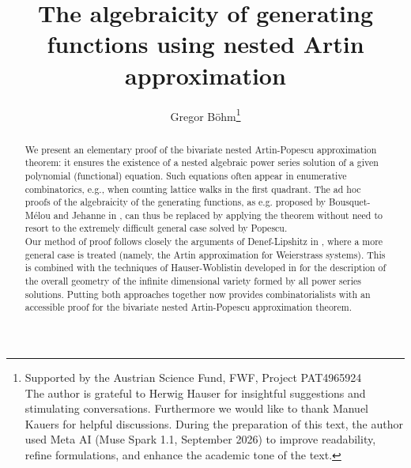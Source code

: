 \documentclass[10pt, a4paper]{article}
\date{}
\title{The algebraicity of generating functions using nested Artin approximation}
\theoremstyle{remark}
\theoremstyle{remark}
\begin{document}
\author{Gregor Böhm\footnote{Supported by the Austrian Science Fund, FWF, Project PAT4965924\\The author is grateful to Herwig Hauser for insightful suggestions and stimulating conversations. Furthermore we would like to thank Manuel Kauers for helpful discussions. During the preparation of this text, the author used Meta AI (Muse Spark 1.1, September 2026) to improve readability, refine formulations, and enhance the academic tone of the text.}}
\maketitle
\begin{abstract}
   We present an elementary proof of the bivariate nested Artin-Popescu approximation theorem: it ensures the existence of a nested algebraic power series solution of a given polynomial (functional) equation. Such equations often appear in enumerative combinatorics, e.g., when counting lattice walks in the first quadrant. The ad hoc proofs of the algebraicity of the generating functions, as e.g. proposed by Bousquet-Mélou and Jehanne in \cite{bousquetmélou2005polynomialequationscatalyticvariable}, can thus be replaced by applying the theorem without need to resort to the extremely difficult general case solved by Popescu.
\\Our method of proof follows closely the arguments of Denef-Lipshitz in \cite{Denef1980},
where a more general case is treated (namely, the Artin approximation for Weierstrass systems). This is combined with the techniques of Hauser-Woblistin developed in \cite{Hauser_Woblistin_2021} for the description of the overall geometry of the infinite dimensional variety formed by all power series solutions. Putting both approaches together now provides combinatorialists with an accessible proof for the bivariate nested Artin-Popescu approximation theorem.
\end{abstract}
\end{document}

